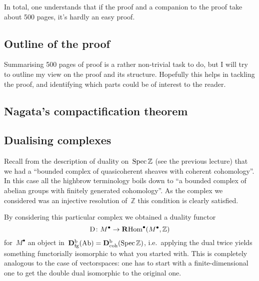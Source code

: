 \documentclass[10pt,a4paper]{article}
\begin{document}
In total, one understands that if the proof and a companion to the proof take about 500 pages, it's hardly an easy proof.

\subsection{Outline of the proof}
Summarising 500 pages of proof is a rather non-trivial task to do, but I will try to outline my view on the proof and its structure. Hopefully this helps in tackling the proof, and identifying which parts could be of interest to the reader.

\subsection{Nagata's compactification theorem}

\subsection{Dualising complexes}
Recall from the description of duality on~$\operatorname{Spec}\mathbb{Z}$ (see the previous lecture) that we had a ``bounded complex of quasicoherent sheaves with coherent cohomology''. In this case all the highbrow terminology boils down to ``a bounded complex of abelian groups with finitely generated cohomology''. As the complex we considered was an injective resolution of~$\mathbb{Z}$ this condition is clearly satisfied.

By considering this particular complex we obtained a duality functor
\begin{equation}
  \operatorname{D}\colon M^\bullet\to\operatorname{\mathbf{R}Hom}^\bullet(M^\bullet,\mathbb{Z})
\end{equation}
for~$M^\bullet$ an object in~$\mathbf{D}_{\mathrm{fg}}^{\mathrm{b}}(\mathrm{Ab})=\mathbf{D}_{\mathrm{coh}}^{\mathrm{b}}(\operatorname{Spec}\mathbb{Z})$, i.e.\ applying the dual twice yields something functorially isomorphic to what you started with. This is completely analogous to the case of vectorspaces: one has to start with a finite-dimensional one to get the double dual isomorphic to the original one.
\end{document}
